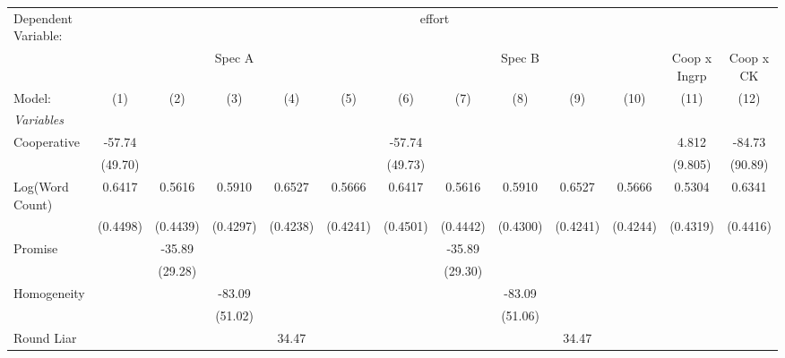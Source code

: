 
\begingroup
\centering
\begin{tabular}{lcccccccccccc}
   \tabularnewline \midrule \midrule
   Dependent Variable: & \multicolumn{12}{c}{effort}\\
    & \multicolumn{5}{c}{Spec A} & \multicolumn{5}{c}{Spec B} & Coop x Ingrp & Coop x CK \\ 
   Model:                                 & (1)      & (2)      & (3)      & (4)      & (5)          & (6)      & (7)      & (8)      & (9)      & (10)         & (11)     & (12)\\  
   \midrule
   \emph{Variables}\\
   Cooperative                            & -57.74   &          &          &          &              & -57.74   &          &          &          &              & 4.812    & -84.73\\   
                                          & (49.70)  &          &          &          &              & (49.73)  &          &          &          &              & (9.805)  & (90.89)\\   
   Log(Word Count)                        & 0.6417   & 0.5616   & 0.5910   & 0.6527   & 0.5666       & 0.6417   & 0.5616   & 0.5910   & 0.6527   & 0.5666       & 0.5304   & 0.6341\\   
                                          & (0.4498) & (0.4439) & (0.4297) & (0.4238) & (0.4241)     & (0.4501) & (0.4442) & (0.4300) & (0.4241) & (0.4244)     & (0.4319) & (0.4416)\\   
   Promise                                &          & -35.89   &          &          &              &          & -35.89   &          &          &              &          &   \\   
                                          &          & (29.28)  &          &          &              &          & (29.30)  &          &          &              &          &   \\   
   Homogeneity                            &          &          & -83.09   &          &              &          &          & -83.09   &          &              &          &   \\   
                                          &          &          & (51.02)  &          &              &          &          & (51.06)  &          &              &          &   \\   
   Round Liar                             &          &          &          & 34.47    &              &          &          &          & 34.47    &              &          &   \\   

\end{tabular}
